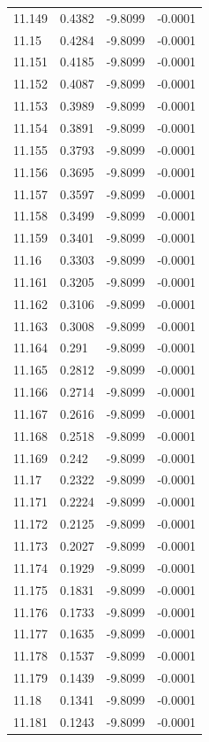 \begin{tabular}{llll}
11.149 & 0.4382 & -9.8099 & -0.0001 \\
11.15 & 0.4284 & -9.8099 & -0.0001 \\
11.151 & 0.4185 & -9.8099 & -0.0001 \\
11.152 & 0.4087 & -9.8099 & -0.0001 \\
11.153 & 0.3989 & -9.8099 & -0.0001 \\
11.154 & 0.3891 & -9.8099 & -0.0001 \\
11.155 & 0.3793 & -9.8099 & -0.0001 \\
11.156 & 0.3695 & -9.8099 & -0.0001 \\
11.157 & 0.3597 & -9.8099 & -0.0001 \\
11.158 & 0.3499 & -9.8099 & -0.0001 \\
11.159 & 0.3401 & -9.8099 & -0.0001 \\
11.16 & 0.3303 & -9.8099 & -0.0001 \\
11.161 & 0.3205 & -9.8099 & -0.0001 \\
11.162 & 0.3106 & -9.8099 & -0.0001 \\
11.163 & 0.3008 & -9.8099 & -0.0001 \\
11.164 & 0.291 & -9.8099 & -0.0001 \\
11.165 & 0.2812 & -9.8099 & -0.0001 \\
11.166 & 0.2714 & -9.8099 & -0.0001 \\
11.167 & 0.2616 & -9.8099 & -0.0001 \\
11.168 & 0.2518 & -9.8099 & -0.0001 \\
11.169 & 0.242 & -9.8099 & -0.0001 \\
11.17 & 0.2322 & -9.8099 & -0.0001 \\
11.171 & 0.2224 & -9.8099 & -0.0001 \\
11.172 & 0.2125 & -9.8099 & -0.0001 \\
11.173 & 0.2027 & -9.8099 & -0.0001 \\
11.174 & 0.1929 & -9.8099 & -0.0001 \\
11.175 & 0.1831 & -9.8099 & -0.0001 \\
11.176 & 0.1733 & -9.8099 & -0.0001 \\
11.177 & 0.1635 & -9.8099 & -0.0001 \\
11.178 & 0.1537 & -9.8099 & -0.0001 \\
11.179 & 0.1439 & -9.8099 & -0.0001 \\
11.18 & 0.1341 & -9.8099 & -0.0001 \\
11.181 & 0.1243 & -9.8099 & -0.0001 \\

\end{tabular}

